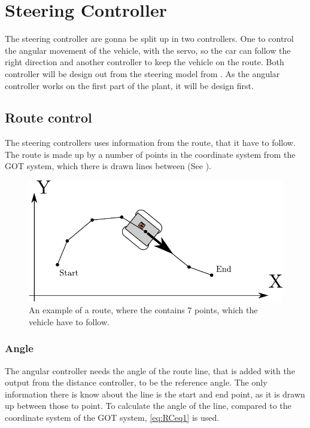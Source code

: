 \section{Steering Controller}\label{sec:steeringController}
The steering controller are gonna be split up in two controllers. One to control the angular movement of the vehicle, with the servo, so the car can follow the right direction and another controller to keep the vehicle on the route. Both controller will be design out from the steering model from . As the angular controller works on the first part of the plant, it will be design first.





\subsection{Route control}
The steering controllers uses information from the route, that it have to follow. The route is made up by a number of points in the coordinate system from the GOT system, which there is drawn lines between (See ).

\begin{figure}[H]
 	\centering
 	\includegraphics[scale=0.7]{figures/stepsGoT}
 	\caption{An example of a route, where the contains 7 points, which the vehicle have to follow.}
 	\label{fig:RCfig1}
\end{figure}

\subsubsection{Angle}
The angular controller needs the angle of the route line, that is added with the output from the distance controller, to be the reference angle. The only information there is know about the line is the start and end point, as it is drawn up between those to point. To calculate the angle of the line, compared to the coordinate system of the GOT system, \eqref{eq:RCeq1} is used.

